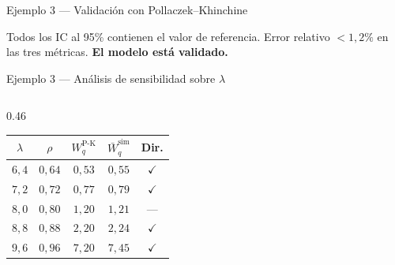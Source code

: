 \documentclass[aspectratio=1610, 10pt]{beamer}
\begin{document}
\begin{frame}{Ejemplo 3 — Validación con Pollaczek--Khinchine}
  \vspace{2pt}
  \begin{resultadobox}
    \footnotesize
    Todos los IC al 95\% contienen el valor de referencia.
    Error relativo $<1{,}2\%$ en las tres métricas.
    \textbf{El modelo está validado.}
  \end{resultadobox}
\end{frame}

\begin{frame}{Ejemplo 3 — Análisis de sensibilidad sobre $\lambda$}
  \begin{columns}[T]
    \begin{column}{0.46\textwidth}
      \begin{center}\scriptsize
        \renewcommand{\arraystretch}{1.25}
        \begin{tabular}{ccccc}
          \toprule
          $\lambda$ & $\rho$ & $W_q^{\text{P-K}}$ & $\bar W_q^{\text{sim}}$ & \textbf{Dir.} \\
          \midrule
          $6{,}4$  & $0{,}64$ & $0{,}53$ & $0{,}55$ & $\checkmark$ \\
          $7{,}2$  & $0{,}72$ & $0{,}77$ & $0{,}79$ & $\checkmark$ \\
          $8{,}0$  & $0{,}80$ & $1{,}20$ & $1{,}21$ & --- \\
          $8{,}8$  & $0{,}88$ & $2{,}20$ & $2{,}24$ & $\checkmark$ \\
          $9{,}6$  & $0{,}96$ & $7{,}20$ & $7{,}45$ & $\checkmark$ \\
          \bottomrule
        \end{tabular}
      \end{center}


\end{column}
\end{columns}
\end{frame}
\end{document}
